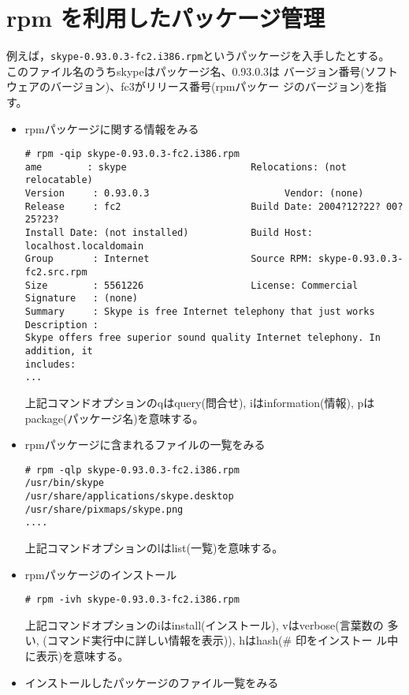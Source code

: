 \documentclass{jreport}
\begin{document}
\section{rpm を利用したパッケージ管理}
例えば，\verb|skype-0.93.0.3-fc2.i386.rpm|というパッケージを入手したとする。
このファイル名のうちskypeはパッケージ名、0.93.0.3は
バージョン番号(ソフトウェアのバージョン)、fc3がリリース番号(rpmパッケー
ジのバージョン)を指す。
\begin{itemize}
\item {rpmパッケージに関する情報をみる}
\begin{screen}
\begin{verbatim}
# rpm -qip skype-0.93.0.3-fc2.i386.rpm
ame        : skype                      Relocations: (not relocatable)
Version     : 0.93.0.3                        Vendor: (none)
Release     : fc2                       Build Date: 2004?12?22? 00?25?23?
Install Date: (not installed)           Build Host: localhost.localdomain
Group       : Internet                  Source RPM: skype-0.93.0.3-fc2.src.rpm
Size        : 5561226                   License: Commercial
Signature   : (none)
Summary     : Skype is free Internet telephony that just works
Description :
Skype offers free superior sound quality Internet telephony. In addition, it
includes:
...
\end{verbatim}
\end{screen}
上記コマンドオプションのqはquery(問合せ), iはinformation(情報), pは
package(パッケージ名)を意味する。
\item rpmパッケージに含まれるファイルの一覧をみる
\begin{screen}
\begin{verbatim}
# rpm -qlp skype-0.93.0.3-fc2.i386.rpm
/usr/bin/skype
/usr/share/applications/skype.desktop
/usr/share/pixmaps/skype.png
....
\end{verbatim}
\end{screen}
上記コマンドオプションのlはlist(一覧)を意味する。
\item {rpmパッケージのインストール}
\begin{screen}
\begin{verbatim}
# rpm -ivh skype-0.93.0.3-fc2.i386.rpm
\end{verbatim}
上記コマンドオプションのiはinstall(インストール), vはverbose(言葉数の
多い, (コマンド実行中に詳しい情報を表示)), hはhash(\# 印をインストー
ル中に表示)を意味する。
\end{screen}
\item {インストールしたパッケージのファイル一覧をみる}

\end{itemize}
\end{document}

